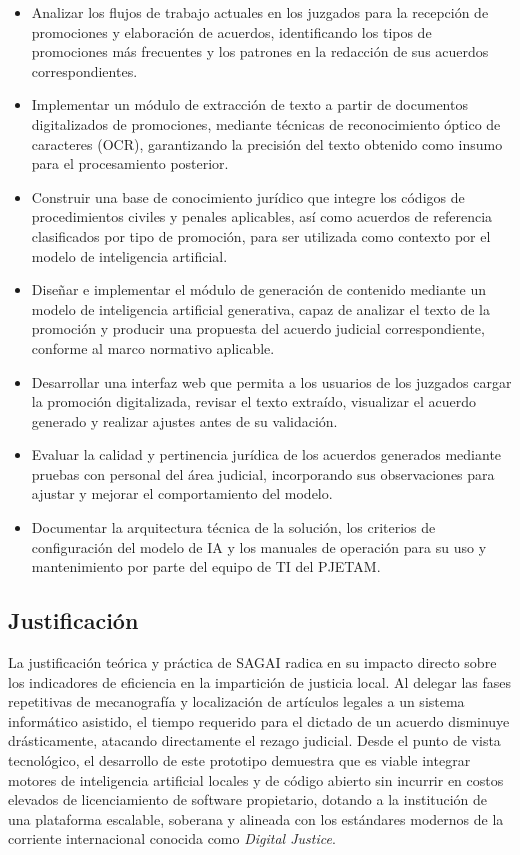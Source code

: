 \begin{itemize}
    \item Analizar los flujos de trabajo actuales en los juzgados para la recepción de promociones y elaboración de acuerdos, identificando los tipos de promociones más frecuentes y los patrones en la redacción de sus acuerdos correspondientes.
    \item Implementar un módulo de extracción de texto a partir de documentos digitalizados de promociones, mediante técnicas de reconocimiento óptico de caracteres (OCR), garantizando la precisión del texto obtenido como insumo para el procesamiento posterior.
    \item Construir una base de conocimiento jurídico que integre los códigos de procedimientos civiles y penales aplicables, así como acuerdos de referencia clasificados por tipo de promoción, para ser utilizada como contexto por el modelo de inteligencia artificial.
    \item Diseñar e implementar el módulo de generación de contenido mediante un modelo de inteligencia artificial generativa, capaz de analizar el texto de la promoción y producir una propuesta del acuerdo judicial correspondiente, conforme al marco normativo aplicable.
    \item Desarrollar una interfaz web que permita a los usuarios de los juzgados cargar la promoción digitalizada, revisar el texto extraído, visualizar el acuerdo generado y realizar ajustes antes de su validación.
    \item Evaluar la calidad y pertinencia jurídica de los acuerdos generados mediante pruebas con personal del área judicial, incorporando sus observaciones para ajustar y mejorar el comportamiento del modelo.
    \item Documentar la arquitectura técnica de la solución, los criterios de configuración del modelo de IA y los manuales de operación para su uso y mantenimiento por parte del equipo de TI del PJETAM.
\end{itemize}

\subsection{Justificación}
\label{sec:justificacion}

La justificación teórica y práctica de SAGAI radica en su impacto directo sobre los indicadores de eficiencia en la impartición de justicia local. Al delegar las fases repetitivas de mecanografía y localización de artículos legales a un sistema informático asistido, el tiempo requerido para el dictado de un acuerdo disminuye drásticamente, atacando directamente el rezago judicial. Desde el punto de vista tecnológico, el desarrollo de este prototipo demuestra que es viable integrar motores de inteligencia artificial locales y de código abierto sin incurrir en costos elevados de licenciamiento de software propietario, dotando a la institución de una plataforma escalable, soberana y alineada con los estándares modernos de la corriente internacional conocida como \textit{Digital Justice}.

